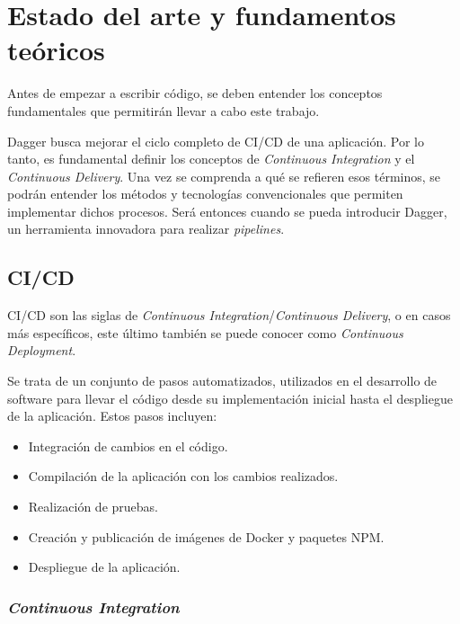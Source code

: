\chapter{Estado del arte y fundamentos teóricos}

Antes de empezar a escribir código, se deben entender los conceptos fundamentales que permitirán llevar a cabo este trabajo.

Dagger busca mejorar el ciclo completo de CI/CD de una aplicación. Por lo tanto, es fundamental definir los conceptos de \textit{Continuous Integration} y el \textit{Continuous Delivery}. Una vez se comprenda a qué se refieren esos términos, se podrán entender los métodos y tecnologías convencionales que permiten implementar dichos procesos. Será entonces cuando se pueda introducir Dagger, un herramienta innovadora para realizar \textit{pipelines}.

\section{CI/CD}

CI/CD son las siglas de \textit{Continuous Integration}/\textit{Continuous Delivery}, o en casos más específicos, este último también se puede conocer como \textit{Continuous Deployment}.

Se trata de un conjunto de pasos automatizados, utilizados en el desarrollo de software para llevar el código desde su implementación inicial hasta el despliegue de la aplicación. Estos pasos incluyen:

\begin{itemize}
  \item Integración de cambios en el código.
  \item Compilación de la aplicación con los cambios realizados.
  \item Realización de pruebas.
  \item Creación y publicación de imágenes de Docker y paquetes NPM.
  \item Despliegue de la aplicación.
\end{itemize}

\subsection*{\textit{Continuous Integration}}
\label{subsec:CI}

